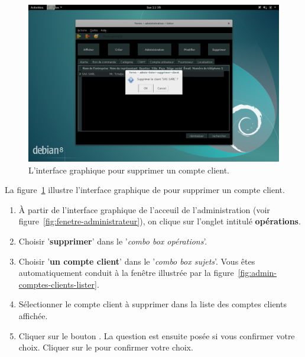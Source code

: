
\newpage
{}

\begin{figure}[!htpb]
	\centering
	\includegraphics[scale=0.39]{images/compte-client-supprimer.png}
	\caption{L'interface graphique pour supprimer un compte client.}
	\label{fig:admin-comptes-clients-supprimer}
\end{figure}

La figure~\ref{fig:admin-comptes-clients-supprimer} illustre
l'interface graphique de \yeroth pour supprimer un compte
client.

\begin{enumerate}[1)]
	\item \`A partir de l'interface graphique de l'acceuil de
		l'administration (voir figure~\ref{fig:fenetre-administrateur}),
		on clique sur l'onglet intitul\'e \textbf{op\'erations}. 
		
	\item Choisir '\textbf{supprimer}' dans le '\emph{combo box
		op\'erations}'.
		
	\item Choisir '\textbf{un compte client}' dans le '\emph{combo box
		sujets}'. Vous \^etes automatiquement conduit \`a la fen\^etre
		illustr\'ee par la figure~\ref{fig:admin-comptes-clients-lister}.
		
	\item S\'electionner le compte client \`a supprimer dans la liste
		des comptes clients affich\'ee.
		
	\item Cliquer sur le bouton . La question
		est ensuite pos\'ee si vous confirmer votre choix.
		Cliquer sur le  pour confirmer votre choix.
\end{enumerate}
